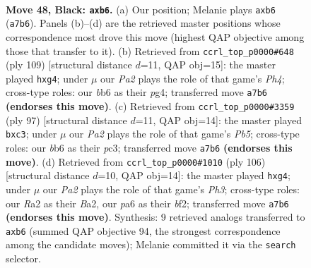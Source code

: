 \documentclass[11pt]{article}
\begin{document}
\clearpage

\begin{figure}[p]\centering
\begin{subfigure}{0.46\textwidth}\centering
\resizebox{\linewidth}{!}{%
\newchessgame
\chessboard[
  setfen={8/p7/PB4k1/8/8/6K1/r7/8 b - - 0 48},
  showmover=false,
  pgfstyle=straightmove, color=movearrow, markmove={a7-b6}
]}
\caption{}
\end{subfigure}\hfill
\begin{subfigure}{0.46\textwidth}\centering
\resizebox{\linewidth}{!}{%
\newchessgame
\chessboard[
  setfen={8/7k/3R4/7p/6PP/8/6K1/1r6 b - - 2 55},
  showmover=false,
  pgfstyle=straightmove, color=movearrow, markmove={h5-g4}
]}
\caption{}
\end{subfigure}
\\[4pt]
\begin{subfigure}{0.46\textwidth}\centering
\resizebox{\linewidth}{!}{%
\newchessgame
\chessboard[
  setfen={8/8/2k5/6R1/1p6/1PP1K3/r7/8 b - - 2 49},
  showmover=false,
  pgfstyle=straightmove, color=movearrow, markmove={b4-c3}
]}
\caption{}
\end{subfigure}\hfill
\begin{subfigure}{0.46\textwidth}\centering
\resizebox{\linewidth}{!}{%
\newchessgame
\chessboard[
  setfen={8/6k1/8/8/5Pp1/3K3P/B4b2/8 w - - 0 54},
  showmover=false,
  pgfstyle=straightmove, color=movearrow, markmove={h3-g4}
]}
\caption{}
\end{subfigure}
\caption{\textbf{Move 48, Black: \texttt{axb6}.} (a) Our position; Melanie plays \texttt{axb6} (\texttt{a7b6}). Panels (b)--(d) are the retrieved master positions whose correspondence most drove this move (highest QAP objective among those that transfer to it). (b) Retrieved from \texttt{ccrl\_top\_p0000\#648} (ply 109) [structural distance $d$=11, QAP obj=15]: the master played \texttt{hxg4}; under $\mu$ our \emph{Pa2} plays the role of that game's \emph{Ph4}; cross-type roles: our \emph{b}b6 as their \emph{p}g4; transferred move \texttt{a7b6} \textbf{(endorses this move)}. (c) Retrieved from \texttt{ccrl\_top\_p0000\#3359} (ply 97) [structural distance $d$=11, QAP obj=14]: the master played \texttt{bxc3}; under $\mu$ our \emph{Pa2} plays the role of that game's \emph{Pb5}; cross-type roles: our \emph{b}b6 as their \emph{p}c3; transferred move \texttt{a7b6} \textbf{(endorses this move)}. (d) Retrieved from \texttt{ccrl\_top\_p0000\#1010} (ply 106) [structural distance $d$=10, QAP obj=14]: the master played \texttt{hxg4}; under $\mu$ our \emph{Pa2} plays the role of that game's \emph{Ph3}; cross-type roles: our \emph{R}a2 as their \emph{B}a2, our \emph{p}a6 as their \emph{b}f2; transferred move \texttt{a7b6} \textbf{(endorses this move)}. Synthesis: 9 retrieved analogs transferred to \texttt{axb6} (summed QAP objective 94, the strongest correspondence among the candidate moves); Melanie committed it via the \texttt{search} selector.}
\label{fig:thought-m95}
\end{figure}
\end{document}
